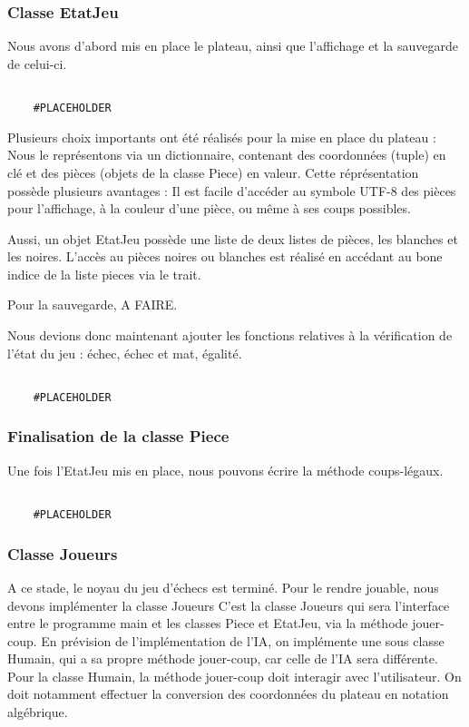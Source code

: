 \documentclass{article}
\begin{document}
\subsubsection{Classe EtatJeu}
Nous avons d'abord mis en place le plateau, ainsi que l'affichage et la sauvegarde de celui-ci.
\begin{verbatim}

    #PLACEHOLDER
\end{verbatim}

Plusieurs choix importants ont été réalisés pour la mise en place du plateau :
Nous le représentons via un dictionnaire, contenant des coordonnées (tuple) en clé
et des pièces (objets de la classe Piece) en valeur. Cette réprésentation
possède plusieurs avantages : Il est facile d'accéder au symbole UTF-8 des pièces
pour l'affichage, à la couleur d'une pièce, ou même à ses coups possibles.

Aussi, un objet EtatJeu possède une liste de deux listes de pièces, les blanches et les noires.
L'accès au pièces noires ou blanches est réalisé en accédant au bone indice de la liste pieces via
le trait.

Pour la sauvegarde, A FAIRE.


Nous devions donc maintenant ajouter les fonctions relatives à la vérification de l'état du jeu
: échec, échec et mat, égalité. 

\begin{verbatim}

    #PLACEHOLDER
\end{verbatim}

\subsubsection{Finalisation de la classe Piece}
Une fois l'EtatJeu mis en place, nous pouvons écrire la méthode coups-légaux.

\begin{verbatim}

    #PLACEHOLDER
\end{verbatim}

\subsubsection{Classe Joueurs}
A ce stade, le noyau du jeu d'échecs est terminé. Pour le rendre jouable,
nous devons implémenter la classe Joueurs
C'est la classe Joueurs qui sera l'interface entre le programme main et les
classes Piece et EtatJeu, via la méthode jouer-coup. En prévision de l'implémentation de l'IA,
on implémente une sous classe Humain, qui a sa propre méthode jouer-coup, car celle de l'IA sera différente.
Pour la classe Humain, la méthode jouer-coup doit interagir avec l'utilisateur. On 
doit notamment effectuer la conversion des coordonnées du plateau en notation algébrique.
\end{document}
